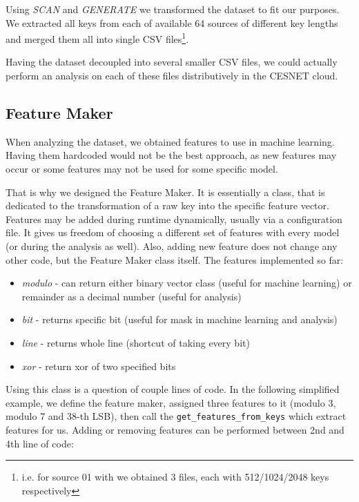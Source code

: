 Using \textit{SCAN} and \textit{GENERATE} we transformed the dataset to fit our purposes. We extracted all keys from each of available 64 sources of different key lengths and merged them all into single CSV files\footnote{i.e. for source 01 with we obtained 3 files, each with 512/1024/2048 keys respectively}. 

Having the dataset decoupled into several smaller CSV files, we could actually perform an analysis on each of these files distributively in the CESNET cloud.

\subsection{Feature Maker}

When analyzing the dataset, we obtained features to use in machine learning. Having them hardcoded would not be the best approach, as new features may occur or some features may not be used for some specific model. 

That is why we designed the Feature Maker. It is essentially a class, that is dedicated to the transformation of a raw key into the specific feature vector. Features may be added during runtime dynamically, usually via a configuration file. It gives us freedom of choosing a different set of features with every model (or during the analysis as well). Also, adding new feature does not change any other code, but the Feature Maker class itself. The features implemented so far:

\begin{itemize}

\item \textit{modulo} - can return either binary vector class (useful for machine learning) or remainder as a decimal number (useful for analysis)
\item \textit{bit} - returns specific bit (useful for mask in machine learning and analysis)
\item \textit{line} - returns whole line (shortcut of taking every bit)
\item \textit{xor} - return xor of two specified bits

\end{itemize}

\noindent
Using this class is a question of couple lines of code. In the following simplified example, we define the feature maker, assigned three features to it (modulo 3, modulo 7 and 38-th LSB), then call the \texttt{get\_features\_from\_keys} which extract features for us. Adding or removing features can be performed between 2nd and 4th line of code:

